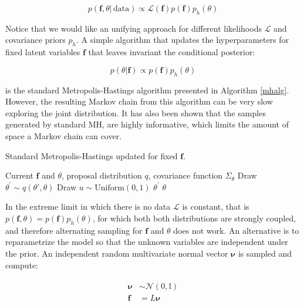 \documentclass[10pt,a4paper,twoside]{book}
\begin{document}
\begin{equation}
p(\boldsymbol{f}, \theta|\, \mathrm{data}) \propto \mathcal{L}(\boldsymbol{f})p(\boldsymbol{f}) p_h(\theta)
\end{equation}

Notice that we would like an unifying approach for different likelihoods $\mathcal{L}$ and covariance priors $p_h$. A simple algorithm that updates the hyperparameters for fixed latent variables $\boldsymbol{f}$ that leaves invariant the conditional posterior:

\begin{equation}
p(\theta|\boldsymbol{f}) \propto p(\boldsymbol{f}) p_h(\theta)
\end{equation}

is the standard Metropolis-Hastings algorithm presented in Algorithm \ref{mhalg}. However, the resulting Markov chain from this algorithm can be very slow exploring the joint distribution. It has also been shown that the samples generated by standard MH, are highly informative, which limits the amount of space a Markov chain can cover.\\

\begin{algorithm}
	\caption{Standard Metropolis-Hastings updated for fixed $\boldsymbol{f}$.}
		\label{mhalg}
		\begin{algorithmic}[1]
		\Require Current $\boldsymbol{f}$ and $\theta$, proposal distribution $q$, covariance function $\Sigma_\theta$ 
		\State Draw $\theta^{'} \sim q(\theta{'}, \theta)$		
		\State Draw $u\sim \mathrm{Uniform}(0, 1)$
			\Return $\theta^{'}$
		\Else\;
			\Return $\theta$
		\EndIf
		\end{algorithmic}
\end{algorithm}

In the extreme limit in which there is no data $\mathcal{L}$ is constant, that is $p(\boldsymbol{f}, \theta) = p(\boldsymbol{f})p_h(\theta)$, for which both both distributions are strongly coupled, and therefore alternating sampling for $\boldsymbol{f}$ and $\theta$ does not work. An alternative is to reparametrize the model so that the unknown variables are independent under the prior. An independent random multivariate normal vector $\boldsymbol{\nu}$ is sampled and compute:

\begin{align}
\begin{split}
\boldsymbol{\nu} &\sim \mathcal{N}(0, \mathbb{I}) \\
\boldsymbol{f} &= L\boldsymbol{\nu}
\end{split}
\end{align}
\end{document}
